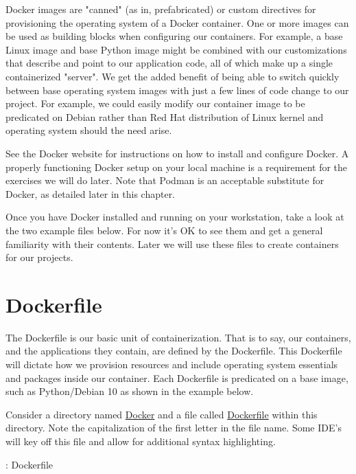 \justify
Docker images are "canned" (as in, prefabricated) or custom directives
for provisioning the operating system of a Docker container. One or more
images can be used as building blocks when configuring our containers.
For example, a base Linux image and base Python image might be combined
with our customizations that describe and point to our application code,
all of which make up a single containerized "server". We get the added
benefit of being able to switch quickly between base operating system
images with just a few lines of code change to our project. For example,
we could easily modify our container image to be predicated on Debian
rather than Red Hat distribution of Linux kernel and operating system
should the need arise.

\justify
See the Docker website for instructions on how to install and configure
Docker. A properly
functioning Docker setup on your local machine is a requirement for the
exercises we will do later. Note that Podman is an acceptable substitute
for Docker, as detailed later in this chapter.

\justify
Once you have Docker installed and running on your workstation, take a
look at the two example files below. For now it's OK to see them and get
a general familiarity with their contents. Later we will use these files
to create containers for our projects.

\section{Dockerfile}
\justify
The Dockerfile is our basic unit of containerization. That is to say,
our containers, and the applications they contain, are defined by the
Dockerfile. This Dockerfile will dictate how we provision resources and
include operating system essentials and packages inside our container.
Each Dockerfile is predicated on a base image, such as Python/Debian 10
as shown in the example below.

\justify
Consider a directory named
\href{https://github.com/hotpeppersec/rapid_secdev_framework/tree/master/docker}{Docker}
and a file called
\href{https://github.com/hotpeppersec/rapid_secdev_framework/blob/master/docker/Dockerfile}{Dockerfile}
within this directory. Note the capitalization of the first letter in the file name. Some IDE's will key off this file and allow for additional syntax highlighting.

\justify
\begin{mybox}{\thetcbcounter: Dockerfile}
  
\end{mybox}


